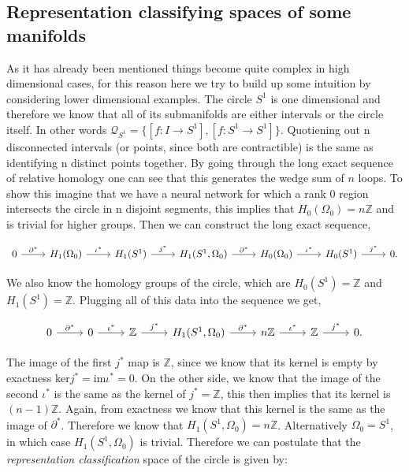 \subsection{Representation classifying spaces of some manifolds}
As it has already been mentioned things become quite complex in high dimensional cases, for this reason here we try to build up some intuition by considering lower dimensional examples. 
The circle $S^1$ is one dimensional and therefore we know that all of its submanifolds are either intervals or the circle itself. In other words $\mathcal{Q}_{S^1} = \{[f: I \to S^1],[f: S^1 \to S^1]\}$. Quotiening out n disconnected intervals (or points, since both are contractible) is the same as identifying n distinct points together. By going through the long exact sequence of relative homology one can see that this generates the wedge sum of $n$ loops. To show this imagine that we have a neural network for which a rank 0 region intersects the circle in n disjoint segments, this implies that $H_0(\Omega_0)=n\mathbb{Z}$ and is trivial for higher groups. Then we can construct the long exact sequence,

\begin{equation}
    \begin{tikzcd}
        0 \arrow[r, "\partial^*"] & H_{1}(\Omega_0) \arrow[r, "\iota^*"] & H_1(S^1) \arrow[r, "j^*"] & H_1(S^1,\Omega_0) \arrow[r, "\partial^*"] & H_{0}(\Omega_0) \arrow[r, "\iota^*"] & H_0(S^1) \arrow[r, "j^*"] & 0.
    \end{tikzcd}
\end{equation}

We also know the homology groups of the circle, which are $H_0(S^1) = \mathbb{Z}$ and $H_1(S^1)=\mathbb{Z}$. Plugging all of this data into the sequence we get,

\begin{equation}
    \begin{tikzcd}
        0 \arrow[r, "\partial^*"] & 0 \arrow[r, "\iota^*"] & \mathbb{Z} \arrow[r, "j^*"] & H_1(S^1,\Omega_0) \arrow[r, "\partial^*"] & n\mathbb{Z} \arrow[r, "\iota^*"] & \mathbb{Z} \arrow[r, "j^*"] & 0.
    \end{tikzcd}
\end{equation}

The image of the first $j^*$ map is $\mathbb{Z}$, since we know that its kernel is empty by exactness ker$j^*=$im$\iota^*=0$. On the other side, we know that the image of the second $\iota^*$ is the same as the kernel of $j^*=\mathbb{Z}$, this then implies that its kernel is $(n-1)\mathbb{Z}$. Again, from exactness we know that this kernel is the same as the image of $\partial^*$. Therefore we know that $H_1(S^1,\Omega_0) = n\mathbb{Z}$. Alternatively $\Omega_0=S^1$, in which case $H_1(S^1,\Omega_0)$ is trivial. Therefore we can postulate that the \textit{representation classification} space of the circle is given by:

